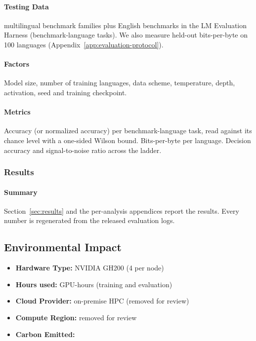 \paragraph{Testing Data}

\nbenchmarks multilingual benchmark families plus English benchmarks in the LM Evaluation Harness (\nbenchmarktasks benchmark-language tasks). We also measure held-out bits-per-byte on 100 languages (Appendix~\ref{app:evaluation-protocol}).

\paragraph{Factors}

Model size, number of training languages, data scheme, temperature, depth, activation, seed and training checkpoint.

\paragraph{Metrics}

Accuracy (or normalized accuracy) per benchmark-language task, read against its chance level with a one-sided Wilson bound. Bits-per-byte per language. Decision accuracy and signal-to-noise ratio across the ladder.

\subsubsection*{Results}

\paragraph{Summary}

Section~\ref{sec:results} and the per-analysis appendices report the results. Every number is regenerated from the released evaluation logs.

\subsection*{Environmental Impact}

\begin{itemize}
    \item \textbf{Hardware Type:} NVIDIA GH200 (4 per node)
    \item \textbf{Hours used:} \ngpuhours GPU-hours (training and evaluation)
    \item \textbf{Cloud Provider:} on-premise HPC (removed for review)
    \item \textbf{Compute Region:} removed for review
    \item \textbf{Carbon Emitted:} 
\end{itemize}

